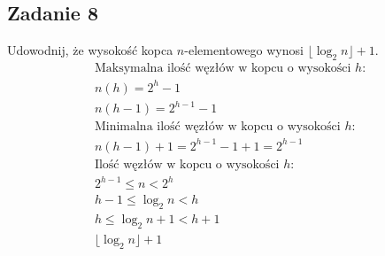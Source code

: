 \documentclass{article}
\begin{document}
\subsection*{Zadanie 8}
Udowodnij, że wysokość kopca $n$-elementowego wynosi $\lfloor\log_2 n\rfloor + 1$.
\begin{gather*}
    \text{Maksymalna ilość węzłów w kopcu o wysokości $h$:} \\
    n(h) = 2^h - 1 \\
    n(h-1) = 2^{h - 1} - 1 \\
    \text{Minimalna ilość węzłów w kopcu o wysokości $h$:} \\
    n(h-1) + 1 = 2^{h - 1} - 1 + 1 = 2^{h - 1} \\
    \text{Ilość węzłów w kopcu o wysokości $h$:} \\
    2^{h - 1} \leq n < 2^h \\
    h-1 \leq \log_2 n < h \\
    h \leq \log_2 n + 1 < h + 1 \\
    \lfloor\log_2 n\rfloor + 1
\end{gather*}
\end{document}
